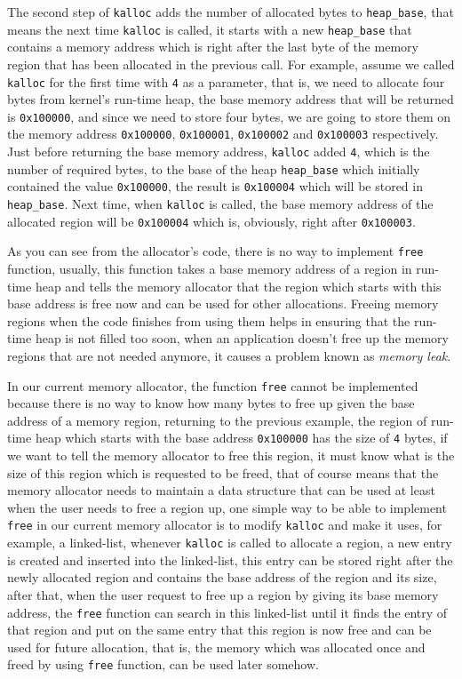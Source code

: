 The second step of \lstinline!kalloc! adds the number of allocated bytes
to \lstinline!heap_base!, that means the next time \lstinline!kalloc! is
called, it starts with a new \lstinline!heap_base! that contains a
memory address which is right after the last byte of the memory region
that has been allocated in the previous call. For example, assume we
called \lstinline!kalloc! for the first time with \lstinline!4! as a
parameter, that is, we need to allocate four bytes from kernel's
run-time heap, the base memory address that will be returned is
\lstinline!0x100000!, and since we need to store four bytes, we are
going to store them on the memory address \lstinline!0x100000!,
\lstinline!0x100001!, \lstinline!0x100002! and \lstinline!0x100003!
respectively. Just before returning the base memory address,
\lstinline!kalloc! added \lstinline!4!, which is the number of required
bytes, to the base of the heap \lstinline!heap_base! which initially
contained the value \lstinline!0x100000!, the result is
\lstinline!0x100004! which will be stored in \lstinline!heap_base!. Next
time, when \lstinline!kalloc! is called, the base memory address of the
allocated region will be \lstinline!0x100004! which is, obviously, right
after \lstinline!0x100003!.

As you can see from the allocator's code, there is no way to implement
\lstinline!free! function, usually, this function takes a base memory
address of a region in run-time heap and tells the memory allocator that
the region which starts with this base address is free now and can be
used for other allocations. Freeing memory regions when the code
finishes from using them helps in ensuring that the run-time heap is not
filled too soon, when an application doesn't free up the memory regions
that are not needed anymore, it causes a problem known as \emph{memory
leak}.

In our current memory allocator, the function \lstinline!free! cannot be
implemented because there is no way to know how many bytes to free up
given the base address of a memory region, returning to the previous
example, the region of run-time heap which starts with the base address
\lstinline!0x100000! has the size of \lstinline!4! bytes, if we want to
tell the memory allocator to free this region, it must know what is the
size of this region which is requested to be freed, that of course means
that the memory allocator needs to maintain a data structure that can be
used at least when the user needs to free a region up, one simple way to
be able to implement \lstinline!free! in our current memory allocator is
to modify \lstinline!kalloc! and make it uses, for example, a
linked-list, whenever \lstinline!kalloc! is called to allocate a region,
a new entry is created and inserted into the linked-list, this entry can
be stored right after the newly allocated region and contains the base
address of the region and its size, after that, when the user request to
free up a region by giving its base memory address, the \lstinline!free!
function can search in this linked-list until it finds the entry of that
region and put on the same entry that this region is now free and can be
used for future allocation, that is, the memory which was allocated once
and freed by using \lstinline!free! function, can be used later somehow.

